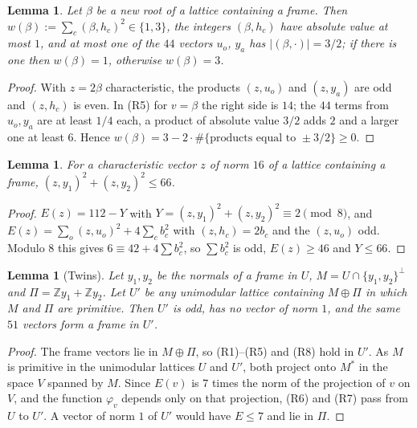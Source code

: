 \documentclass[11pt]{amsart}
\newtheorem{lemma}[theorem]{Lemma}
\theoremstyle{definition}
\theoremstyle{remark}
\newcommand{\Z}{\mathbb{Z}}
\newcommand{\Pl}{\Pi}
\begin{document}
\begin{lemma}\label{lem:newroots}
Let $\beta$ be a new root of a lattice containing a frame. Then $w(\beta):=\sum_c(\beta,h_c)^2\in\{1,3\}$, the integers
$(\beta,h_c)$ have absolute value at most $1$, and at most one of the $44$ vectors $u_o$, $y_a$ has
$|(\beta,\cdot)|=3/2$; if there is one then $w(\beta)=1$, otherwise $w(\beta)=3$.
\end{lemma}

\begin{proof}
With $z=2\beta$ characteristic, the products $(z,u_o)$ and $(z,y_a)$ are odd and $(z,h_c)$ is even. In (R5) for $v=\beta$
the right side is $14$; the $44$ terms from $u_o,y_a$ are at least $1/4$ each, a product of absolute value $3/2$ adds $2$ and
a larger one at least $6$. Hence $w(\beta)=3-2\cdot\#\{\text{products equal to }\pm 3/2\}\ge0$.
\end{proof}

\begin{lemma}\label{lem:char}
For a characteristic vector $z$ of norm $16$ of a lattice containing a frame, $(z,y_1)^2+(z,y_2)^2\le66$.
\end{lemma}

\begin{proof}
$E(z)=112-Y$ with $Y=(z,y_1)^2+(z,y_2)^2\equiv2\pmod8$, and $E(z)=\sum_o(z,u_o)^2+4\sum_cb_c^2$ with $(z,h_c)=2b_c$ and
the $(z,u_o)$ odd. Modulo $8$ this gives $6\equiv42+4\sum b_c^2$, so $\sum b_c^2$ is odd, $E(z)\ge46$ and $Y\le66$.
\end{proof}

\begin{lemma}[Twins]\label{lem:twin}
Let $y_1,y_2$ be the normals of a frame in $U$, $M=U\cap\{y_1,y_2\}^\perp$ and $\Pl=\Z y_1+\Z y_2$. Let $U'$ be any
unimodular lattice containing $M\oplus\Pl$ in which $M$ and $\Pl$ are primitive. Then $U'$ is odd, has no vector of norm $1$,
and the same $51$ vectors form a frame in $U'$.
\end{lemma}

\begin{proof}
The frame vectors lie in $M\oplus\Pl$, so (R1)--(R5) and (R8) hold in $U'$. As $M$ is primitive in the unimodular lattices
$U$ and $U'$, both project onto $M^*$ in the space $V$ spanned by $M$. Since $E(v)$ is $7$ times the norm of the projection
of $v$ on $V$, and the function $\varphi_v$ depends only on that projection, (R6) and (R7) pass from $U$ to $U'$. A vector of
norm $1$ of $U'$ would have $E\le7$ and lie in $\Pl$.
\end{proof}
\end{document}
